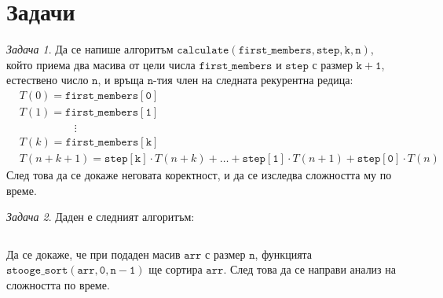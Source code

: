 \documentclass{article}
\theoremstyle{definition}
\theoremstyle{plain}
\theoremstyle{remark}
\newtheorem{problem}{Задача}
\theoremstyle{definition}
\begin{document}
\section*{Задачи}

\begin{problem}
Да се напише алгоритъм $\mathtt{calculate(first\_members, step, k, n)}$, който приема два масива от цели числа $\mathtt{first\_members}$ и $\mathtt{step}$ с размер $\mathtt{k + 1}$, естествено число $\mathtt{n}$, и връща $\mathtt{n}$-тия член на следната рекурентна редица:
\begin{align*}
     & T(0) = \mathtt{first\_members[0]}                                                                                      \\
     & T(1) = \mathtt{first\_members[1]}                                                                                      \\
     & \phantom{0000000000} \vdots                                                                                            \\
     & T(k) = \mathtt{first\_members[k]}                                                                                      \\
     & T(n + k + 1) = \mathtt{step[k]} \cdot T(n + k) + \dots + \mathtt{step[1]} \cdot T(n + 1) + \mathtt{step[0]} \cdot T(n)
\end{align*}
След това да се докаже неговата коректност, и да се изследва сложността му по време.
\end{problem}

\begin{problem}
Даден е следният алгоритъм:
\inputminted[linenos]{c++}{algorithms/stooge_sort.cpp}
Да се докаже, че при подаден масив $\mathtt{arr}$ с размер $\mathtt{n}$, функцията $\mathtt{stooge\_sort(arr, 0, n - 1)}$ ще сортира $\mathtt{arr}$.
След това да се направи анализ на сложността по време.
\end{problem}
\end{document}
